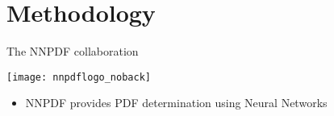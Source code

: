 
\section{Methodology}

\begin{frame}{The NNPDF collaboration}

\vspace*{\titleskip}

\begin{center}
\texttt{[image: nnpdflogo\_noback]}
\end{center}

\vspace*{\secondskip}

\begin{itemize}
	\item NNPDF provides PDF determination using Neural Networks
\end{itemize}

\end{frame}


%
%
%	
%	
%
%
%
%	
%
%
%


